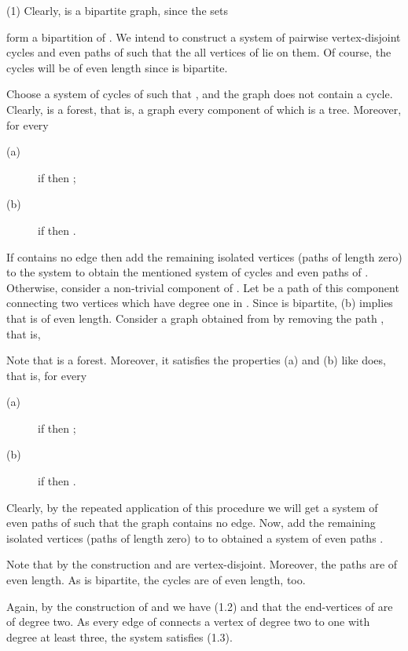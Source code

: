 \documentclass[fleqn,12pt,twoside]{article}
\newenvironment{proof}[1][Proof.]{\begin{trivlist}
\item[\hskip \labelsep {\bfseries #1}]}{\end{trivlist}}
\begin{document}
\begin{proof}
(1) Clearly,  is a bipartite graph, since the sets

form a bipartition of . We intend to construct a system of
pairwise
vertex-disjoint cycles and even paths of  such that the all vertices of  lie on them. Of course, the cycles will be of even length since  is bipartite.

Choose a system of cycles  of  such that
,  and the graph
 does not contain a
cycle. Clearly,  is a forest, that is, a graph every
component of which is a tree. Moreover, for every 

\begin{description}
\item[(a)] if  then ;

\item[(b)] if  then .
\end{description}

If  contains no edge then add the remaining isolated vertices
(paths of length zero) to the system to obtain the mentioned system
of cycles and even paths of . Otherwise, consider a non-trivial
component of . Let  be a path of this component
connecting two vertices which have degree one in . Since 
is bipartite, (b) implies that  is of even length. Consider a
graph  obtained from  by removing
the path , that is,

Note that  is a forest. Moreover, it satisfies the properties
(a) and (b) like  does, that is, for every 

\begin{description}
\item[(a)] if  then ;

\item[(b)] if  then .
\end{description}

Clearly, by the repeated application of this procedure we will get a
system of even paths  of  such that the
graph 
contains no edge. Now, add the remaining isolated vertices (paths of
length zero) to  to obtained a system of even
paths .

Note that by the construction  and
 are vertex-disjoint. Moreover, the paths
 are of even length. As  is bipartite, the
cycles  are of even length, too.

Again, by the construction of  and
 we have (1.2) and that the end-vertices of
 are of degree two. As every edge of  connects a
vertex of degree two to one with degree at least three, the system
 satisfies (1.3).


\end{proof}
\end{document}
